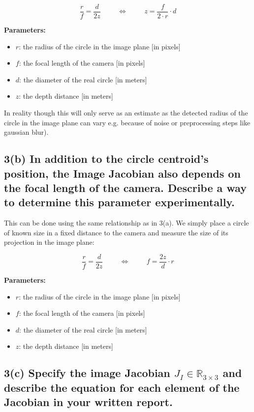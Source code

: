 \documentclass[a4paper,10pt]{article}
\begin{document}
$$\frac{r}{f} = \frac{d}{2z} \hspace{1cm} \Longleftrightarrow \hspace{1cm} z=\frac{f}{2 \cdot r} \cdot d$$

\textbf{Parameters:}
\begin{itemize}
  \item $r$: the radius of the circle in the image plane [in pixels]
  \item $f$: the focal length of the camera [in pixels]
  \item $d$: the diameter of the real circle [in meters]
  \item $z$: the depth distance [in meters]
\end{itemize}

In reality though this will only serve as an estimate as the detected radius of the circle in the image plane can vary e.g. because of noise or preprocessing steps like gaussian blur).


\subsection*{3(b) In addition to the circle centroid's position, the Image Jacobian also depends on the focal length of the camera. Describe a way to determine this parameter experimentally.}

This can be done using the same relationship as in 3(a). We simply place a circle of known size in a fixed distance to the camera and measure the size of its projection in the image plane:

$$\frac{r}{f} = \frac{d}{2z} \hspace{1cm} \Longleftrightarrow \hspace{1cm} f=\frac{2z}{d} \cdot r$$

\textbf{Parameters:}
\begin{itemize}
  \item $r$: the radius of the circle in the image plane [in pixels]
  \item $f$: the focal length of the camera [in pixels]
  \item $d$: the diameter of the real circle [in meters]
  \item $z$: the depth distance [in meters]
\end{itemize}


\subsection*{3(c) Specify the image Jacobian $J_I \in \mathbb{R}_{3\times3}$ and describe the equation for each element of the Jacobian in your written report.}
\end{document}
